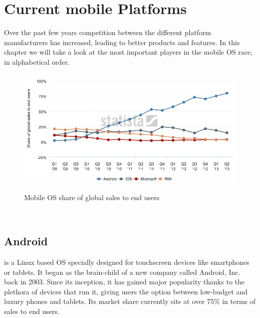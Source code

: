 \chapter{Current mobile Platforms}\label{ch:m_plats}
Over the past few years competition between the different platform manufacturers has increased, leading to better products and features. In this chapter we will take a look at the most important players in the mobile \ac{OS} race, in alphabetical order.

\begin{figure}[H]
    \begin{center}
        {\includegraphics[width=1\linewidth]{gfx/statista-mobile}}
        \caption[Mobile OS share of global sales to end users]{Mobile OS share of global sales to end users\footnotemark}\label{fig:trend}
    \end{center}
\end{figure}
\\

\section{Android}
 is a Linux based \ac{OS} specially designed for touchscreen devices like smartphones or tablets. It began as the brain-child of a new company called Android, Inc. back in 2003. Since its inception, it has gained major popularity thanks to the plethora of devices that run it, giving users the option between low-budget and luxury phones and tablets. Its market share currently sits at over 75\% in terms of sales to end users.

